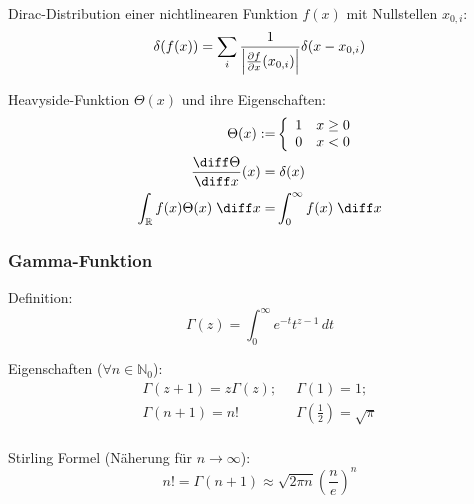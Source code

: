 \documentclass[11pt]{article}
\numberwithin{equation}{section}
\begin{document}
        Dirac-Distribution einer nichtlinearen Funktion $f(x)$ mit Nullstellen $x_{0,i}$:
        \begin{equation}
          \delta(f(x)) = \sum_i \frac{1}{\left|\frac{\partial f}{\partial x}(x_{0,i})\right|}\delta(x-x_{0,i})
        \end{equation}

        Heavyside-Funktion $\Theta(x)$ und ihre Eigenschaften:
        \begin{equation}
          \begin{aligned}
            \Theta(x) :=& \left\{\begin{array}{ll}
                1 & x\ge 0 \\
                0 & x<0 \\
              \end{array}\right. \\
              \tder{\Theta}{x}(x) =&\; \delta(x) \\
              \int_{\mathbb{R}} f(x)\Theta(x)\;\diff x =& \int_{0}^{\infty} f(x)\;\diff x
            \end{aligned}
        \end{equation}

  		\subsubsection{Gamma-Funktion}
    			Definition:
    			\begin{equation}
    				\Gamma(z)=\int_0^{\infty}e^{-t}t^{z-1}\,dt
    			\end{equation}

    			Eigenschaften ($\forall n\in\mathbb{N}_0$):
    			\begin{equation}
      			\begin{array}{cc}
      				\Gamma(z+1)=z\Gamma(z);
      				&\;\; \Gamma\left(1 \right)=1; \\
      				\Gamma(n+1) = n!
      				&\;\; \Gamma\left(\frac{1}{2} \right)=\sqrt{\pi} \\
      			\end{array}
    			\end{equation}

          Stirling Formel (Näherung für $n\rightarrow\infty$):
          \begin{equation}
            n! = \Gamma(n+1) \approx \sqrt{2\pi n} \left( \frac{n}{e} \right)^{n}
          \end{equation}
\end{document}
